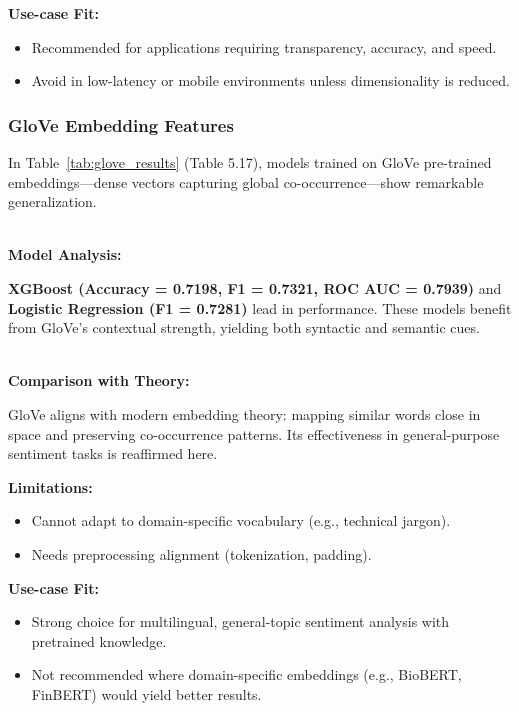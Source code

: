 \textbf{Use-case Fit:}

\begin{itemize}
    \item Recommended for applications requiring transparency, accuracy, and speed.
    \item Avoid in low-latency or mobile environments unless dimensionality is reduced.
\end{itemize}

\subsubsection{GloVe Embedding Features}

In Table~\ref{tab:glove_results} (Table 5.17), models trained on GloVe pre-trained embeddings—dense vectors capturing global co-occurrence—show remarkable generalization.

${}$\\
\textbf{Model Analysis:} 

\textbf{XGBoost (Accuracy = 0.7198, F1 = 0.7321, ROC AUC = 0.7939)} and \textbf{Logistic Regression (F1 = 0.7281)} lead in performance. These models benefit from GloVe’s contextual strength, yielding both syntactic and semantic cues.

${}$\\
\textbf{Comparison with Theory:} 

GloVe aligns with modern embedding theory: mapping similar words close in space and preserving co-occurrence patterns. Its effectiveness in general-purpose sentiment tasks is reaffirmed here.

\textbf{Limitations:}

\begin{itemize}
    \item Cannot adapt to domain-specific vocabulary (e.g., technical jargon).
    \item Needs preprocessing alignment (tokenization, padding).
\end{itemize}

\textbf{Use-case Fit:}

\begin{itemize}
    \item Strong choice for multilingual, general-topic sentiment analysis with pretrained knowledge.
    \item Not recommended where domain-specific embeddings (e.g., BioBERT, FinBERT) would yield better results.
\end{itemize}

